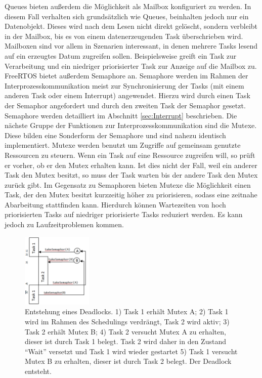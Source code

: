 Queues bieten außerdem die Möglichkeit als Mailbox konfiguriert zu werden. In diesem Fall verhalten sich grund\-sätz\-lich wie Queues, beinhalten jedoch nur ein Datenobjekt. Dieses wird nach dem Lesen nicht direkt gelöscht, sondern verbleibt in der Mailbox, bis es von einem datenerzeugenden Task über\-schrie\-ben wird. Mailboxen sind vor allem in Szenarien interessant, in denen mehrere Tasks lesend auf ein erzeugtes Datum zugreifen sollen. Beispielsweise greift ein Task zur Verarbeitung und ein niedriger priorisierter Task zur Anzeige auf die Mailbox zu\cite[p.143ff]{MasteringFreeRtos}.
\newline
FreeRTOS bietet außerdem Semaphore an. Semaphore werden im Rahmen der Interprozesskommunikation meist zur Synchronisierung der Tasks (mit einem anderen Task oder einem Interrupt) angewendet. 
Hierzu wird durch einen Task der Semaphor angefordert und durch den zweiten Task der Semaphor gesetzt. Semaphore werden detailliert im Abschnitt \ref{sec:Interrupt} beschrieben.
\newline
Die nächste Gruppe der Funktionen zur Interprozesskommunikation sind die Mutexe. Diese bilden eine Sonderform der Semaphore und sind nahezu identisch implementiert. 
Mutexe werden benutzt um Zugriffe auf gemeinsam genutzte Ressourcen zu steuern. Wenn ein Task auf eine Ressource zugreifen will, so prüft er vorher, ob er den Mutex erhalten kann. Ist dies nicht der Fall, weil ein anderer Task den Mutex besitzt, so muss der Task warten bis der andere Task den Mutex zurück gibt. 
Im Gegensatz zu Semaphoren bieten Mutexe die Möglichkeit einen Task, der den Mutex besitzt kurzzeitig höher zu priorisieren, sodass eine zeitnahe Abarbeitung stattfinden kann. Hierdurch können Wartezeiten von hoch priorisierten Tasks auf niedriger priorisierte Tasks reduziert werden. Es kann jedoch zu Laufzeitproblemen kommen.  
\begin{figure}[ht!]
	\centering
		\includegraphics[width=0.3\textwidth]{Pictures/Intertask/Deadlock.png}
	\caption{Entstehung eines Deadlocks. 1) Task 1 erhält Mutex A; 2) Task 1 wird im Rahmen des Schedulings verdrängt, Task 2 wird aktiv; 3) Task 2 erhält Mutex B; 4) Task 2 versucht Mutex A zu erhalten, dieser ist durch Task 1 belegt. Task 2 wird daher in den Zustand "`Wait"' versetzt und Task 1 wird wieder gestartet 5) Task 1 versucht Mutex B zu erhalten, dieser ist durch Task 2 belegt. Der Deadlock entsteht.}
	\label{fig:Deadlock}
\end{figure}

